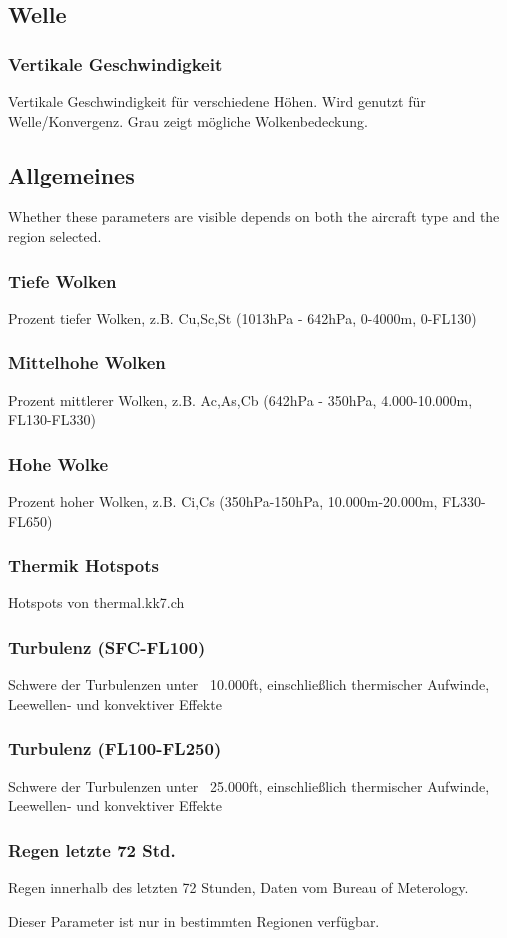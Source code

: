 \documentclass[11pt,a4paper]{article}
\begin{document}
\subsection{Welle}
\subsubsection{Vertikale Geschwindigkeit}
Vertikale Geschwindigkeit für verschiedene Höhen. Wird genutzt für Welle/Konvergenz. Grau zeigt mögliche Wolkenbedeckung.

\subsection{Allgemeines}
Whether these parameters are visible depends on both the aircraft type and the region selected. 
\subsubsection{Tiefe Wolken}
Prozent tiefer Wolken, z.B. Cu,Sc,St (1013hPa - 642hPa, 0-4000m, 0-FL130)
\subsubsection{Mittelhohe Wolken}
Prozent mittlerer Wolken, z.B. Ac,As,Cb (642hPa - 350hPa, 4.000-10.000m, FL130-FL330) 
\subsubsection{Hohe Wolke}
Prozent hoher Wolken, z.B. Ci,Cs (350hPa-150hPa, 10.000m-20.000m, FL330-FL650)
\subsubsection{Thermik Hotspots}
Hotspots von thermal.kk7.ch
\subsubsection{Turbulenz (SFC-FL100)}
Schwere der Turbulenzen unter ~10.000ft, einschließlich thermischer Aufwinde, Leewellen- und konvektiver Effekte
\subsubsection{Turbulenz (FL100-FL250)}
Schwere der Turbulenzen unter ~25.000ft, einschließlich thermischer Aufwinde, Leewellen- und konvektiver Effekte
\subsubsection{Regen letzte 72 Std.}
Regen innerhalb des letzten 72 Stunden, Daten vom Bureau of Meterology.
\begin{tip}
\item Dieser Parameter ist nur in bestimmten Regionen verfügbar.\\
\end{tip}
\end{document}
